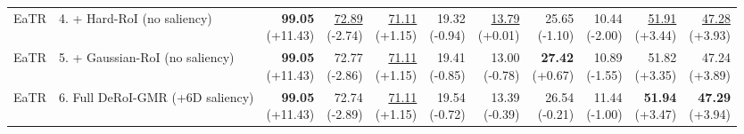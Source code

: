 \documentclass{article}
\begin{document}
{\begin{tabular}{llrrrrrrrrr}
EaTR & 4. + Hard-RoI (no saliency) & \shortstack{\textbf{99.05} \\ {\scriptsize (+11.43)}} & \shortstack{\underline{72.89} \\ {\scriptsize (-2.74)}} & \shortstack{\underline{71.11} \\ {\scriptsize (+1.15)}} & \shortstack{19.32 \\ {\scriptsize (-0.94)}} & \shortstack{\underline{13.79} \\ {\scriptsize (+0.01)}} & \shortstack{25.65 \\ {\scriptsize (-1.10)}} & \shortstack{10.44 \\ {\scriptsize (-2.00)}} & \shortstack{\underline{51.91} \\ {\scriptsize (+3.44)}} & \shortstack{\underline{47.28} \\ {\scriptsize (+3.93)}} \\
EaTR & 5. + Gaussian-RoI (no saliency) & \shortstack{\textbf{99.05} \\ {\scriptsize (+11.43)}} & \shortstack{72.77 \\ {\scriptsize (-2.86)}} & \shortstack{\underline{71.11} \\ {\scriptsize (+1.15)}} & \shortstack{19.41 \\ {\scriptsize (-0.85)}} & \shortstack{13.00 \\ {\scriptsize (-0.78)}} & \shortstack{\textbf{27.42} \\ {\scriptsize (+0.67)}} & \shortstack{10.89 \\ {\scriptsize (-1.55)}} & \shortstack{51.82 \\ {\scriptsize (+3.35)}} & \shortstack{47.24 \\ {\scriptsize (+3.89)}} \\
EaTR & 6. Full DeRoI-GMR (+6D saliency) & \shortstack{\textbf{99.05} \\ {\scriptsize (+11.43)}} & \shortstack{72.74 \\ {\scriptsize (-2.89)}} & \shortstack{\underline{71.11} \\ {\scriptsize (+1.15)}} & \shortstack{19.54 \\ {\scriptsize (-0.72)}} & \shortstack{13.39 \\ {\scriptsize (-0.39)}} & \shortstack{26.54 \\ {\scriptsize (-0.21)}} & \shortstack{11.44 \\ {\scriptsize (-1.00)}} & \shortstack{\textbf{51.94} \\ {\scriptsize (+3.47)}} & \shortstack{\textbf{47.29} \\ {\scriptsize (+3.94)}} \\

\end{tabular}}
\end{document}
